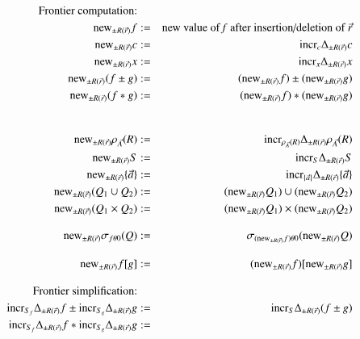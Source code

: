\documentclass{article}
\begin{document}
%
%
\begin{figure*}
\begin{eqnarray}
\mbox{Frontier computation:} && \nonumber
\\
\nonumber\algnew_{\pm R(\vec{r})} f &:=& \mbox{new value of \emph{f} after insertion/deletion of } \vec{r} \\
\label{eq:new1}
\algnew_{\pm R(\vec{r})} c       &:=& \algincr_{c} \Delta_{\pm R(\vec{r})} c \\
\label{eq:new2}
\algnew_{\pm R(\vec{r})} x       &:=& \algincr_{x} \Delta_{\pm R(\vec{r})} x \\
\label{eq:new3}
\algnew_{\pm R(\vec{r})} (f \pm g) &:=&
(\algnew_{\pm R(\vec{r})} f) \pm (\algnew_{\pm R(\vec{r})} g) \\
\label{eq:new4}
\algnew_{\pm R(\vec{r})} (f * g) &:=&
(\algnew_{\pm R(\vec{r})} f) * (\algnew_{\pm R(\vec{r})} g)\\
%
%
\nonumber\\[2ex]
\label{eq:newr1}
\algnew_{\pm R(\vec{r})} \rho_{\vec{A}}(R) &:=&
   \algincr_{\rho_{\vec{A}}(R)} \Delta_{\pm R(\vec{r})} \rho_{\vec{A}}(R)
\\
\label{eq:newr2}
\algnew_{\pm R(\vec{r})} S &:=& \algincr_{S} \Delta_{\pm R(\vec{r})} S
\\
\label{eq:newr3}
\algnew_{\pm R(\vec{r})} \{ \vec{a} \} &:=&
\algincr_{\{ \vec{a} \}} \Delta_{\pm R(\vec{r})} \{ \vec{a} \}
\\
\label{eq:newr4}
\algnew_{\pm R(\vec{r})} (Q_1 \cup Q_2) &:=&
   (\algnew_{\pm R(\vec{r})} Q_1) \cup (\algnew_{\pm R(\vec{r})} Q_2)
\\
\label{eq:newr5}
\algnew_{\pm R(\vec{r})} (Q_1 \times Q_2) &:=&
   (\algnew_{\pm R(\vec{r})} Q_1) \times (\algnew_{\pm R(\vec{r})} Q_2)
%
%
\\[2ex]
\label{eq:newr6}
\algnew_{\pm R(\vec{r})} \sigma_{f \theta 0}(Q) &:=&
   \sigma_{(\algnew_{\pm R(\vec{r})} f) \theta 0}(\algnew_{\pm R(\vec{r})} Q)
%
%
\\[2ex]
\label{eq:newr7}
\algnew_{\pm R(\vec{r})} f[g] & := &
   (\algnew_{\pm R(\vec{r})} f)[\algnew_{\pm R(\vec{r})} g]
%
%
%
\\[2ex]
\mbox{Frontier simplification:} && \nonumber
\\
\label{eq:fs1}
\algincr_{S_f} \Delta_{\pm R(\vec{r})} f
    \pm \algincr_{S_g} \Delta_{\pm R(\vec{r})} g &:=&
\algincr_{S} \Delta_{\pm R(\vec{r})} (f \pm g)
\\
\label{eq:fs2}
\algincr_{S_f} \Delta_{\pm R(\vec{r})} f * \algincr_{S_g} \Delta_{\pm R(\vec{r})} g &:=&

\end{eqnarray}
\end{figure*}
\end{document}
